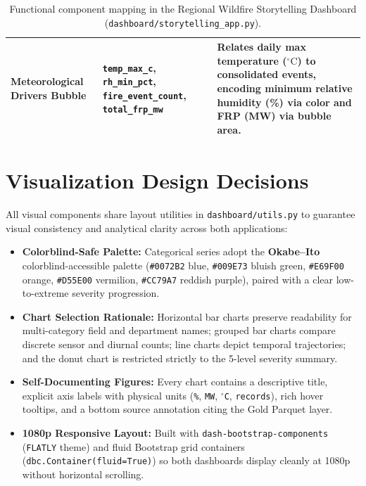 \documentclass[11pt,a4paper]{article}
\begin{document}
\begin{table}[htbp]
\begin{tabularx}{\textwidth}{>{\RaggedRight\arraybackslash}p{3.1cm} >{\RaggedRight\arraybackslash}p{3.5cm} >{\RaggedRight\arraybackslash}X}
\addlinespace[3pt]
Meteorological Drivers Bubble & \texttt{temp\_\allowbreak max\_\allowbreak c}, \texttt{rh\_\allowbreak min\_\allowbreak pct}, \texttt{fire\_\allowbreak event\_\allowbreak count}, \texttt{total\_\allowbreak frp\_\allowbreak mw} & Relates daily max temperature ($^\circ\text{C}$) to consolidated events, encoding minimum relative humidity (\%) via color and FRP (MW) via bubble area. \\
\bottomrule
\end{tabularx}
\caption{Functional component mapping in the Regional Wildfire Storytelling Dashboard (\texttt{dashboard/storytelling\_app.py}).}
\label{tab:story_mapping}
\end{table}

\FloatBarrier

\section{Visualization Design Decisions}

All visual components share layout utilities in \texttt{dashboard/utils.py} to guarantee visual consistency and analytical clarity across both applications:
\begin{itemize}[leftmargin=1.4em, itemsep=3pt]
    \item \textbf{Colorblind-Safe Palette:} Categorical series adopt the \textbf{Okabe--Ito} colorblind-accessible palette (\texttt{\#0072B2} blue, \texttt{\#009E73} bluish green, \texttt{\#E69F00} orange, \texttt{\#D55E00} vermilion, \texttt{\#CC79A7} reddish purple), paired with a clear low-to-extreme severity progression.
    \item \textbf{Chart Selection Rationale:} Horizontal bar charts preserve readability for multi-category field and department names; grouped bar charts compare discrete sensor and diurnal counts; line charts depict temporal trajectories; and the donut chart is restricted strictly to the 5-level severity summary.
    \item \textbf{Self-Documenting Figures:} Every chart contains a descriptive title, explicit axis labels with physical units (\texttt{\%}, \texttt{MW}, \texttt{$^\circ$C}, \texttt{records}), rich hover tooltips, and a bottom source annotation citing the Gold Parquet layer.
    \item \textbf{1080p Responsive Layout:} Built with \texttt{dash-bootstrap-components} (\texttt{FLATLY} theme) and fluid Bootstrap grid containers (\texttt{dbc.Container(fluid=True)}) so both dashboards display cleanly at 1080p without horizontal scrolling.
\end{itemize}
\end{document}

